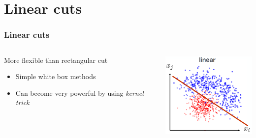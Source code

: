 \documentclass{beamer}
\begin{document}

\section{Linear cuts}

\begin{frame}
    \frametitle{Linear cuts}
    \begin{columns}[T] %
        \begin{column}{.48\textwidth}
            More flexible than rectangular cut
            \begin{itemize}
                \item<1-> Simple white box methods 
                \item<2-> Can become very powerful by using \emph{kernel trick}
            \end{itemize}
        \end{column}%
        \hfill%
        \begin{column}{.48\textwidth}
            \raggedright\includegraphics[height=4.3cm,keepaspectratio]{pics/mva_cut_linear.png}%
            
        \end{column}%
    \end{columns}

\end{frame} 

\end{document}
